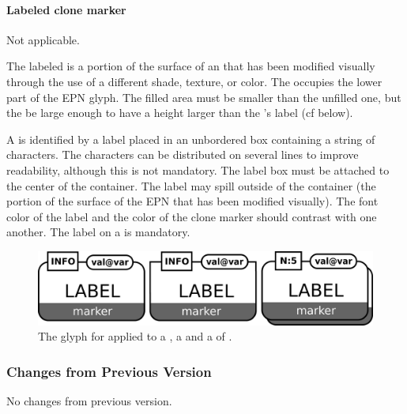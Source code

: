 \paragraph{Labeled clone marker}

\begin{glyphDescription}

\glyphSboTerm Not applicable.

\glyphContainer The labeled  is a portion of the surface of an  that has been modified visually through the use of a different shade, texture, or color.  The  occupies the lower part of the EPN glyph. The filled area must be smaller than the unfilled one, but the be large enough to have a height larger than the 's label (cf below).

\glyphLabel A  is identified by a label placed in an unbordered box containing a string of characters.  The characters can be distributed on several lines to improve readability, although this is not mandatory.  The label box must be attached to the center of the container.  The label may spill outside of the container (the portion of the surface of the EPN that has been modified visually).  The font color of the label and the color of the clone marker should contrast with one another.  The label on a  is mandatory.

\end{glyphDescription}

\begin{figure}[htb]
  \centering
  \includegraphics[scale = 0.3]{images/labeledCloneMarker}
  \caption{The \PD glyph for  applied to a , a  and a  of .}
  \label{fig:techref:labeledCloneMarker}
\end{figure}

\subsubsection{Changes from Previous Version}

No changes from previous version.

